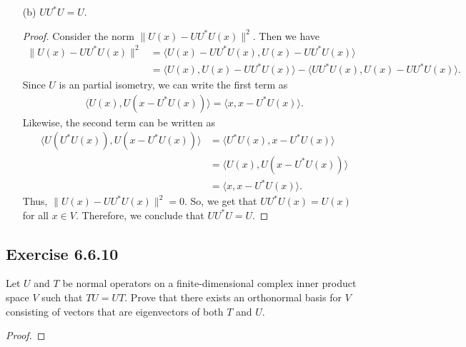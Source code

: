 \begin{enumerate}
\begin{proof}
       \[   N(U^{*}U) = (N(U^{*}U)^{\perp})^{\perp}  = R(U^{*}U)^{\perp}  \]
       which shows the second result.
        \end{proof}
    \item[(b)] \( U U^{*} U = U  \).
        \begin{proof}
        Consider the norm \( \| U(x) - U U^{*} U (x) \|^{2} \). Then we have
        \begin{align*}
            \|U(x) - U U^{*} U (x) \|^{2} &= \langle U(x) - U U^{*} U (x)  ,  U (x) - U U^{*} U(x)  \rangle \\
                                          &=  \langle U(x) , U(x) - U U^{*} U(x)   \rangle - \langle U U^{*} U(x)  , U(x) - U U^{*} U(x)  \rangle.
        \end{align*}
        Since \( U  \) is an partial isometry, we can write the first term as
        \begin{align*}
            \langle U(x)  , U ( x - U^{*}U(x)) \rangle = \langle x  ,  x - U^{*}U(x)  \rangle.
        \end{align*}
        Likewise, the second term can be written as
        \begin{align*}
            \langle U(U^{*}U(x)) , U(x -  U^{*} U(x))  \rangle &= \langle U^{*}U(x)  , x -  U^{*} U(x)  \rangle \\
                                                                &= \langle U(x)  , U(x -  U^{*} U(x)) \rangle \\
                                                                &= \langle x  ,  x -  U^{*} U (x)  \rangle.
        \end{align*}
        Thus, \( \|U(x) - U U^{*} U(x) \|^{2} = 0  \). So, we get that \( U U^{*} U(x) = U(x)  \) for all \( x \in V  \). Therefore, we conclude that \( U U^{*} U = U  \).
        \end{proof}
\end{enumerate}

\subsection*{Exercise 6.6.10} Let \( U \) and \( T  \) be normal operators on a finite-dimensional complex inner product space \( V  \) such that \( TU = UT  \). Prove that there exists an orthonormal basis for \( V  \) consisting of vectors that are eigenvectors of both \( T  \) and \( U  \).
\begin{proof}

\end{proof}

